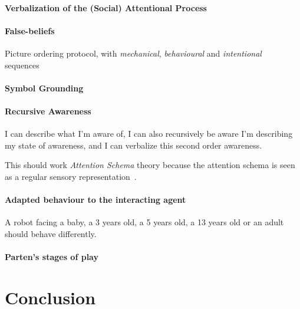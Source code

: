 \documentclass[a4paper]{article}
\begin{document}
\paragraph{Verbalization of the (Social) Attentional Process}
\paragraph{False-beliefs}


Picture ordering protocol, with \emph{mechanical}, \emph{behavioural} and
\emph{intentional} sequences~\cite{baron1986mechanical}

\paragraph{Symbol Grounding}

\paragraph{Recursive Awareness}

I can describe what I'm aware of, I can also recursively be aware I'm describing
my state of awareness, and I can verbalize this second order awareness.

This should work \emph{Attention Schema} theory because the attention schema
is seen as a regular sensory
representation~\citep[p.55]{graziano2013consciousness}.

\paragraph{Adapted behaviour to the interacting agent}

A robot facing a baby, a 3 years old, a 5 years old, a 13 years old or an adult
should behave differently.


\paragraph{Parten's stages of play}


\section{Conclusion}



\end{document}
